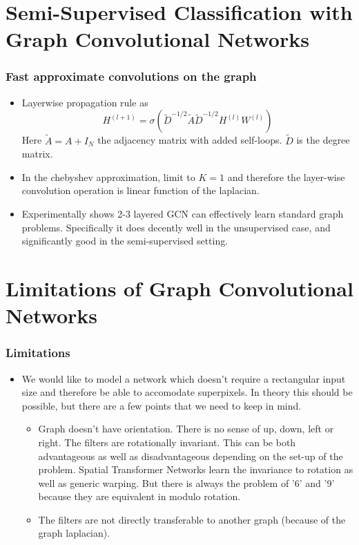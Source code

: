 \documentclass{beamer}
\begin{document}
\section{Semi-Supervised Classification with Graph Convolutional Networks}
\begin{frame}
  \frametitle{Fast approximate convolutions on the graph}
  \begin{itemize}
  \item Layerwise propagation rule as
    $$H^{(l+1)} = \sigma(\tilde{D}^{-1/2}\tilde{A}\tilde{D}^{-1/2}H^{(l)}W^{(l)})$$
    Here $\tilde{A} = A + I_N$ the adjacency matrix with added self-loops. $\tilde{D}$ is the degree matrix.
  \item In the chebyshev approximation, limit to $K=1$ and therefore the layer-wise convolution operation is linear function of the laplacian.
  \item Experimentally shows 2-3 layered GCN can effectively learn standard graph problems. Specifically it does decently well in the unsupervised case, and significantly good in the semi-supervised setting.
  \end{itemize}
\end{frame}

\section{Limitations of Graph Convolutional Networks}
\begin{frame}
  \frametitle{Limitations}
  \begin{itemize}
  \item We would like to model a network which doesn't require a rectangular input size and therefore be able to accomodate superpixels. In theory this should be possible, but there are a few points that we need to keep in mind.
    \begin{itemize}
    \item Graph doesn't have orientation. There is no sense of up, down, left or right. The filters are rotationally invariant. This can be both advantageous as well as disadvantageous depending on the set-up of the problem. Spatial Transformer Networks learn the invariance to rotation as well as generic warping. But there is always the problem of '6' and '9' because they are equivalent in modulo rotation.
    \item The filters are not directly transferable to another graph (because of the graph laplacian).
    \end{itemize}
  \end{itemize}
\end{frame}

% 
% 
\end{document}
